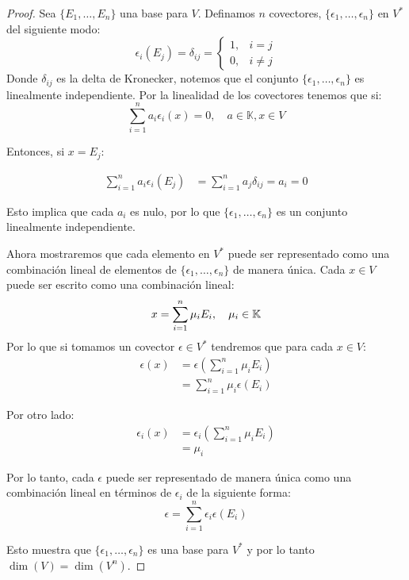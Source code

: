 \begin{proof}
  Sea $\{E_1, \dots, E_n\}$ una base para $V$. Definamos $n$ covectores, $\{\epsilon_1, \dots, \epsilon_n\}$ en $V^{*}$ del siguiente modo:
  \[
    \epsilon_i(E_j) = \delta_{ij} = \begin{cases}
      1, & i = j\\
      0, & i \neq j
    \end{cases}
  \]
  Donde $\delta_{ij}$ es la delta de Kronecker, notemos que el conjunto $\{\epsilon_1, \dots, \epsilon_n\}$ es linealmente independiente. Por la linealidad de los covectores tenemos que si:
\[
  \sum_{i=1}^{n} a_i \epsilon_i(x) = 0, \quad a \in \mathbb{K}, x \in V
\]

  Entonces, si $x = E_j$:

\begin{align*}
  \sum_{i=1}^n a_i \epsilon_i (E_j) &= \sum_{i=1}^n a_j \delta_{ij} = a_i = 0
\end{align*}

  Esto implica que cada $a_i$ es nulo, por lo que $\{\epsilon_1, \dots, \epsilon_n\}$ es un conjunto linealmente independiente.

  Ahora mostraremos que cada elemento en $V^{*}$ puede ser representado como una combinación lineal de elementos de $\{\epsilon_1, \dots, \epsilon_n\}$ de manera única. Cada $x \in V$ puede ser escrito como una combinación lineal:
  \[
    x = \sum_{i=1}^{n} \mu_{i} E_i, \quad \mu_i \in \mathbb{K}
  \]
  Por lo que si tomamos un covector $\epsilon \in V^{*}$ tendremos que para cada $x \in V$:
  \begin{align*}
    \epsilon(x) &= \epsilon
    \left (\sum_{i=1}^{n} \mu_i E_i \right)\\
    &= \sum_{i=1}^{n} \mu_i \epsilon \left(E_i \right)
  \end{align*}

  Por otro lado:
  \begin{align*}
    \epsilon_i(x) &= \epsilon_i\left(\sum_{i=1}^{n} \mu_i E_i\right) \\
    &= \mu_i
  \end{align*}

  Por lo tanto, cada $\epsilon$ puede ser representado de manera única como una combinación lineal en términos de $\epsilon_i$ de la siguiente forma:
  \[
    \epsilon = \sum_{i=1}^{n} \epsilon_i \epsilon(E_i)
  \]

  Esto muestra que $\{\epsilon_1, \dots, \epsilon_n\}$ es una base para $V^{*}$ y por lo tanto $\dim(V) = \dim(V^{n})$.
\end{proof}

